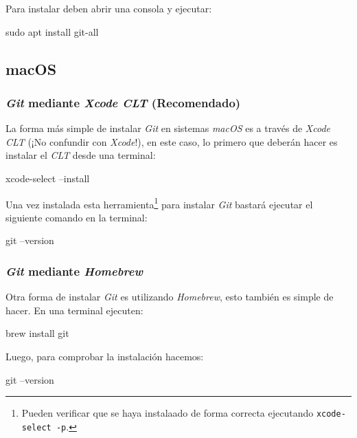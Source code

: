     Para instalar deben abrir una consola y ejecutar:
    \begin{bash}
      sudo apt install git-all 
    \end{bash}

  \subsection{macOS}
    \subsubsection{\textit{Git} mediante \textit{Xcode CLT} (Recomendado)}
      La forma más simple de instalar \textit{Git} en sistemas \textit{macOS} es a 
      través de \textit{Xcode CLT} (¡No confundir con \textit{Xcode}!), en este 
      caso, lo primero que deberán hacer es instalar el \textit{CLT} desde una terminal:
      
      \begin{bash}
        xcode-select --install
      \end{bash}
      
      Una vez instalada esta herramienta\footnote{Pueden verificar que se haya instalaado de forma 
      correcta ejecutando \texttt{xcode-select -p}.} para instalar \textit{Git} bastará ejecutar el
      siguiente comando en la terminal:

      \begin{bash}
        git --version
      \end{bash}
    \subsubsection{\textit{Git} mediante \textit{Homebrew}}
      Otra forma de instalar \textit{Git} es utilizando \textit{Homebrew}, esto también es simple de
      hacer.
      En una terminal ejecuten:

      \begin{bash}
        brew install git
      \end{bash}

      Luego, para comprobar la instalación hacemos:

      \begin{bash}
        git --version
      \end{bash}
